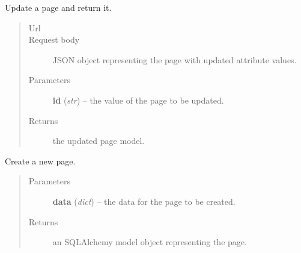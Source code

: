 \documentclass[letterpaper,10pt,english]{sphinxmanual}
\begin{document}
\begin{fulllineitems}
\begin{fulllineitems}
\begin{quote}
\begin{description}
\end{description}\end{quote}

\end{fulllineitems}


\begin{fulllineitems}
\label{api:onlinelinguisticdatabase.controllers.pages.PagesController.update}
Update a page and return it.
\begin{quote}\begin{description}
\item[{Url }] \leavevmode
{}

\item[{Request body}] \leavevmode
JSON object representing the page with updated attribute values.

\item[{Parameters}] \leavevmode
\textbf{id} (\emph{str}) -- the  value of the page to be updated.

\item[{Returns}] \leavevmode
the updated page model.

\end{description}\end{quote}

\end{fulllineitems}


\end{fulllineitems}


\begin{fulllineitems}
\label{api:onlinelinguisticdatabase.controllers.pages.createNewPage}
Create a new page.
\begin{quote}\begin{description}
\item[{Parameters}] \leavevmode
\textbf{data} (\emph{dict}) -- the data for the page to be created.

\item[{Returns}] \leavevmode
an SQLAlchemy model object representing the page.

\end{description}\end{quote}

\end{fulllineitems}
\end{document}

